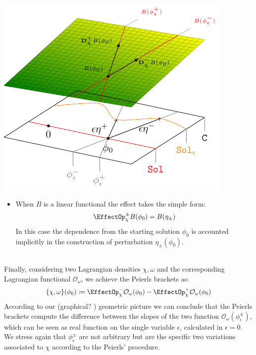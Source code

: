 \documentclass[Main]{subfiles}
\begin{document}
		\vspace{1mm}		
		\begin{minipage}{0.5\textwidth}
			\includegraphics[width=\textwidth]{Pictures/GeometricPictureLinear1}
		\end{minipage}
		\begin{minipage}{0.5\textwidth}
			\begin{itemize}
				\item  When $B$ is a linear functional the effect takes the simple form:
					\begin{displaymath}
						\EffectOp_\chi^\pm B (\phi_0) = B ( \eta_\pm)
					\end{displaymath}
					In this case the dependence from the starting solution $\phi_0$ is accounted implicitly in the construction of perturbation $\eta_\pm(\phi_0)$.
			\end{itemize}
		\end{minipage}
		\vspace{1mm}\\	

		Finally, 
		considering two Lagrangian densities $\chi, \omega$ and the corresponding Lagrangian functional $ \mathcal{O}_\omega$, we achieve the Peierls brackets as:
		\begin{displaymath}
			\{\chi, \omega \}(\phi_0) \coloneqq \EffectOp_\chi^- \mathcal{O}_\omega (\phi_0) - \EffectOp_\chi^+ \mathcal{O}_\omega(\phi_0)
		\end{displaymath}
		According to our (\danger graphical? \danger) geometric picture we can conclude that the Peierls brackets compute the difference between the slopes of the two function $\mathcal{O}_\omega ( \phi_\epsilon^\pm)$, which can be seen as real function on the single variable $\epsilon$, calculated in $\epsilon=0$.
		We stress again that $ \phi_\epsilon^\pm$ are not arbitrary but are the specific two variations associated to $\chi$ according to the Peierls' procedure.
		
\end{document}
